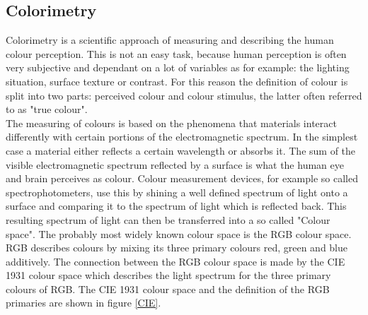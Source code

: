\subsection{Colorimetry}
Colorimetry is a scientific approach of measuring and describing the human colour perception. This is not an easy task, because human perception is often very subjective and dependant on a lot of variables as for example: the lighting situation, surface texture or contrast. For this reason the definition of colour is split into two parts: perceived colour and colour stimulus, the latter often referred to as "true colour".\\
The measuring of colours is based on the phenomena that materials interact differently with certain portions of the electromagnetic spectrum. In the simplest case a material either reflects a certain wavelength or absorbs it. The sum of the visible electromagnetic spectrum reflected by a surface is what the human eye and brain perceives as colour. Colour measurement devices, for example so called spectrophotometers, use this by shining a well defined spectrum of light onto a surface and comparing it to the spectrum of light which is reflected back. This resulting spectrum of light can then be transferred into a so called "Colour space". The probably most widely known colour space is the RGB colour space. RGB describes colours by mixing its three primary colours red, green and blue additively. The connection between the RGB colour space is made by the CIE 1931 colour space which describes the light spectrum for the three primary colours of RGB. The CIE 1931 colour space and the definition of the RGB primaries are shown in figure \ref{CIE}.

